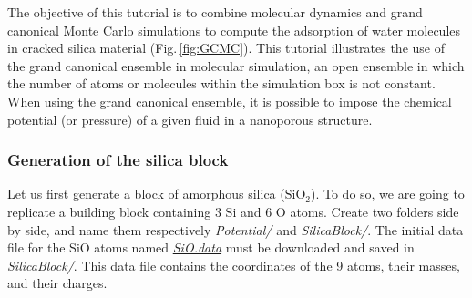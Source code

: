 \documentclass[9pt,tutorial]{livecoms}
\begin{document}
\noindent The objective of this tutorial is to combine molecular dynamics and grand canonical Monte Carlo simulations to compute the adsorption of water molecules in cracked silica material (Fig.\,\ref{fig:GCMC}). This tutorial illustrates the use of the grand canonical ensemble in molecular simulation, an open ensemble in which the number of atoms or molecules within the simulation box is not constant. When using the grand canonical ensemble, it is possible to impose the chemical potential (or pressure) of a given fluid in a nanoporous structure.

\subsubsection{Generation of the silica block}
\noindent Let us first generate a block of amorphous silica ($\text{SiO}_2$). To do so, we are going to replicate a building block containing 3 Si and 6 O atoms. Create two folders side by side, and name them respectively \textit{Potential/}
and \textit{SilicaBlock/}. The initial data file for the SiO atoms named \href{https://raw.githubusercontent.com/lammpstutorials/lammpstutorials-article/main/files/tutorial6/SiO.data}{\textit{SiO.data}} must be downloaded and saved in \textit{SilicaBlock/}. This data file contains the coordinates of the 9 atoms, their masses, and their charges.
\end{document}
